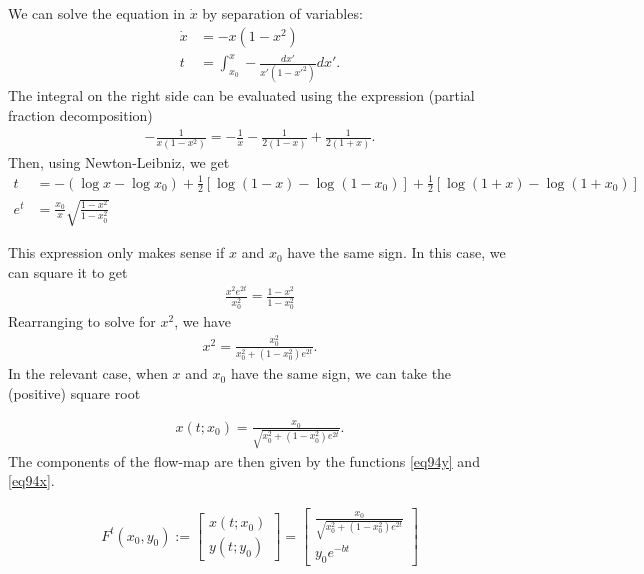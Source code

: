 \begin{solution}[9.4]
We can solve the equation in $\dot{x}$ by separation of variables:
\begin{align}
    \dot{x} &= -x(1-x^2) \\ 
    t &= \int_{x_0}^{x} -\frac{dx'}{x'(1-x'^2)}d x' .
\end{align}
    The integral on the right side can be evaluated using the expression (partial fraction decomposition)
    \begin{align}
    -\frac{1}{x(1-x^2)} = -\frac{1}{x} - \frac{1}{2(1-x)} + \frac{1}{2(1+x)}.
    \end{align}
Then, using Newton-Leibniz, we get
\begin{align}
t &= -(\log x - \log x_0) + \frac{1}{2}\left[\log(1-x) - \log(1-x_0)\right] + \frac{1}{2}\left[\log(1+x) - \log(1+x_0)\right ] \\
e^t &= \frac{x_0}{x}\sqrt{\frac{1-x^2}{1-x_0^2}} 
\end{align}

This expression only makes sense if $x$ and $x_0$ have the same sign. In this case, we can square it to get 
\begin{align}
\frac{x^2 e^{2t}}{x_0^2} = \frac{1-x^2}{1-x_0^2}\end{align}
Rearranging to solve for $x^2$, we have
\begin{align}
x^2 = \frac{x_0^2}{x_0^2 + (1-x_0^2)e^{2t}}.
\end{align}
In the relevant case, when $x$ and $x_0$ have the same sign, we can take the (positive) square root 

\begin{align}
\label{eq94x}
    x(t;x_0) = \frac{x_0}{\sqrt{x_0^2 + (1-x_0^2)e^{2t}}}.
\end{align}
The components of the flow-map are then given by the functions \eqref{eq94y} and \eqref{eq94x}. 

\begin{align}
    F^t(x_0,y_0) := \begin{bmatrix} 
    x(t; x_0) \\
    y(t; y_0)
    \end{bmatrix} = \begin{bmatrix} 
    \frac{x_0}{\sqrt{x_0^2 + (1-x_0^2)e^{2t}}}\\
    y_0e^{-bt}
    \end{bmatrix}
\end{align}


\end{solution}
